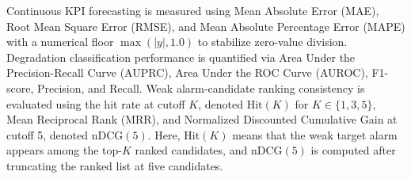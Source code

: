 Continuous KPI forecasting is measured using Mean Absolute Error (MAE), Root Mean Square Error (RMSE), and Mean Absolute Percentage Error (MAPE) with a numerical floor $\max(|y|, 1.0)$ to stabilize zero-value division. Degradation classification performance is quantified via Area Under the Precision-Recall Curve (AUPRC), Area Under the ROC Curve (AUROC), F1-score, Precision, and Recall. Weak alarm-candidate ranking consistency is evaluated using the hit rate at cutoff $K$, denoted $\mathrm{Hit}(K)$ for $K \in \{1, 3, 5\}$, Mean Reciprocal Rank (MRR), and Normalized Discounted Cumulative Gain at cutoff 5, denoted $\mathrm{nDCG}(5)$. Here, $\mathrm{Hit}(K)$ means that the weak target alarm appears among the top-$K$ ranked candidates, and $\mathrm{nDCG}(5)$ is computed after truncating the ranked list at five candidates.
